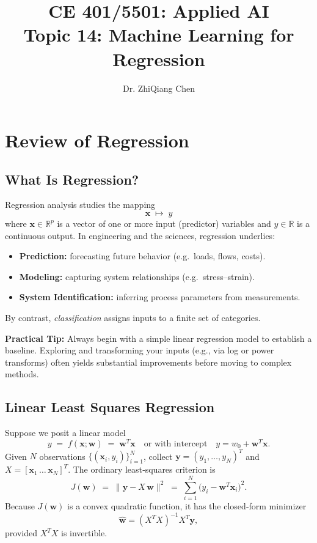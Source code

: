 \documentclass[12pt]{article}
\newcommand{\field}[1]{\mathbb{#1}}
\newcommand{\Rset}{\field{R}}
\begin{document}
\doublespacing	

\title{CE 401/5501: Applied AI \\ \large Topic 14: Machine Learning for Regression}
\author{Dr. ZhiQiang Chen}
\date{}
\maketitle

\section{Review of Regression}

\subsection{What Is Regression?}
Regression analysis studies the mapping
\[
  \bm{x} \;\longmapsto\; y
\]
where \(\bm{x}\in\Rset^p\) is a vector of one or more input (predictor) variables and \(y\in\Rset\) is a continuous output.  In engineering and the sciences, regression underlies:
\begin{itemize}
  \item \textbf{Prediction:} forecasting future behavior (e.g.\ loads, flows, costs).
  \item \textbf{Modeling:} capturing system relationships (e.g.\ stress–strain).
  \item \textbf{System Identification:} inferring process parameters from measurements.
\end{itemize}
By contrast, \emph{classification} assigns inputs to a finite set of categories.


\noindent
\colorbox{green!10}{%
  \parbox{\textwidth}{%
    \textbf{Practical Tip:} Always begin with a simple linear regression model to establish a baseline. Exploring and transforming your inputs (e.g., via log or power transforms) often yields substantial improvements before moving to complex methods.
  }%
}

\subsection{Linear Least Squares Regression}
Suppose we posit a linear model
\[
  y \;=\; f(\bm{x};\bm{w})
  \;=\;\bm{w}^T\bm{x}
  \quad\text{or with intercept}\quad
  y = w_0 + \bm{w}^T\bm{x}.
\]
Given \(N\) observations \(\{(\bm{x}_i,y_i)\}_{i=1}^N\), collect
\(\bm{y}=(y_1,\dots,y_N)^T\) and \(X=[\bm{x}_1\,\dots\,\bm{x}_N]^T\).  The ordinary least‐squares criterion is
\[
  J(\bm{w})
  \;=\;
  \bigl\|\bm{y} - X\,\bm{w}\bigr\|^2
  \;=\;
  \sum_{i=1}^N \bigl(y_i - \bm{w}^T\bm{x}_i\bigr)^2.
\]
Because \(J(\bm{w})\) is a convex quadratic function, it has the closed‐form minimizer
\[
  \hat{\bm{w}}
  =
  (X^T X)^{-1} X^T \bm{y},
\]
provided \(X^T X\) is invertible.
\end{document}
